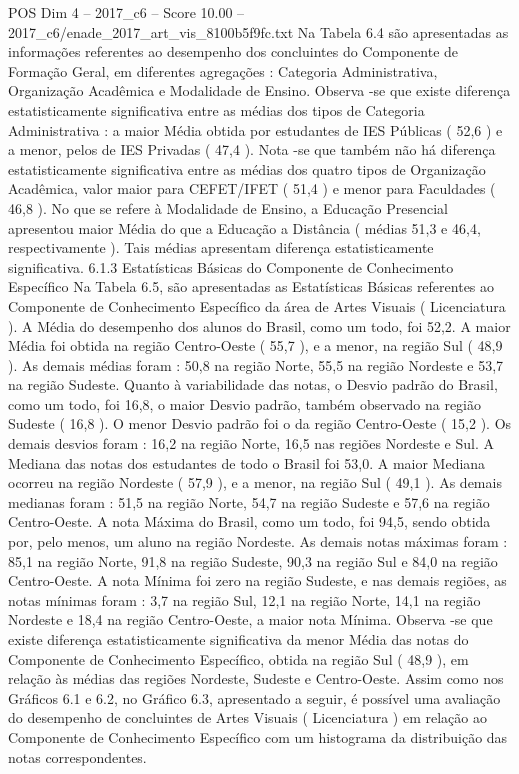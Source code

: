 \begin{textsample}{POS Dim 4 – 2017\_c6 – Score 10.00 – 2017\_c6/enade\_2017\_art\_vis\_8100b5f9fc.txt}
Na Tabela 6.4 são apresentadas as informações referentes ao desempenho dos concluintes do Componente de Formação Geral, em diferentes agregações : Categoria Administrativa, Organização Acadêmica e Modalidade de Ensino.
Observa -se que existe diferença estatisticamente significativa entre as médias dos tipos de Categoria Administrativa : a maior Média obtida por estudantes de IES Públicas ( 52,6 ) e a menor, pelos de IES Privadas ( 47,4 ).
Nota -se que também não há diferença estatisticamente significativa entre as médias dos quatro tipos de Organização Acadêmica, valor maior para CEFET/IFET ( 51,4 ) e menor para Faculdades ( 46,8 ).
No que se refere à Modalidade de Ensino, a Educação Presencial apresentou maior Média do que a Educação a Distância ( médias 51,3 e 46,4, respectivamente ).
Tais médias apresentam diferença estatisticamente significativa. 6.1.3 Estatísticas Básicas do Componente de Conhecimento Específico Na Tabela 6.5, são apresentadas as Estatísticas Básicas referentes ao Componente de Conhecimento Específico da área de Artes Visuais ( Licenciatura ).
A Média do desempenho dos alunos do Brasil, como um todo, foi 52,2.
A maior Média foi obtida na região Centro-Oeste ( 55,7 ), e a menor, na região Sul ( 48,9 ).
As demais médias foram : 50,8 na região Norte, 55,5 na região Nordeste e 53,7 na região Sudeste.
Quanto à variabilidade das notas, o Desvio padrão do Brasil, como um todo, foi 16,8, o maior Desvio padrão, também observado na região Sudeste ( 16,8 ).
O menor Desvio padrão foi o da região Centro-Oeste ( 15,2 ).
Os demais desvios foram : 16,2 na região Norte, 16,5 nas regiões Nordeste e Sul.
A Mediana das notas dos estudantes de todo o Brasil foi 53,0.
A maior Mediana ocorreu na região Nordeste ( 57,9 ), e a menor, na região Sul ( 49,1 ).
As demais medianas foram : 51,5 na região Norte, 54,7 na região Sudeste e 57,6 na região Centro-Oeste.
A nota Máxima do Brasil, como um todo, foi 94,5, sendo obtida por, pelo menos, um aluno na região Nordeste.
As demais notas máximas foram : 85,1 na região Norte, 91,8 na região Sudeste, 90,3 na região Sul e 84,0 na região Centro-Oeste.
A nota Mínima foi zero na região Sudeste, e nas demais regiões, as notas mínimas foram : 3,7 na região Sul, 12,1 na região Norte, 14,1 na região Nordeste e 18,4 na região Centro-Oeste, a maior nota Mínima.
Observa -se que existe diferença estatisticamente significativa da menor Média das notas do Componente de Conhecimento Específico, obtida na região Sul ( 48,9 ), em relação às médias das regiões Nordeste, Sudeste e Centro-Oeste.
Assim como nos Gráficos 6.1 e 6.2, no Gráfico 6.3, apresentado a seguir, é possível uma avaliação do desempenho de concluintes de Artes Visuais ( Licenciatura ) em relação ao Componente de Conhecimento Específico com um histograma da distribuição das notas correspondentes.

\end{textsample}
